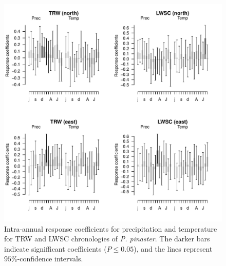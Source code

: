 \documentclass[review,authoryear]{elsarticle}
\begin{document}
\clearpage
\begin{figure}\centering
\includegraphics[scale=0.7,trim=20mm 0mm 20mm 0mm]{FunRes} 
\caption{Intra-annual response coefficients for precipitation and
  temperature for \acrfull{TRW} and \acrfull{LWSC} chronologies of
  \textit{P. pinaster}. The darker bars indicate signifficant
  coefficients ($P\le0.05$), and the lines represent $95\%$-confidence
  intervals.}
\label{fig:FunRes} 
\end{figure}

\end{document}
